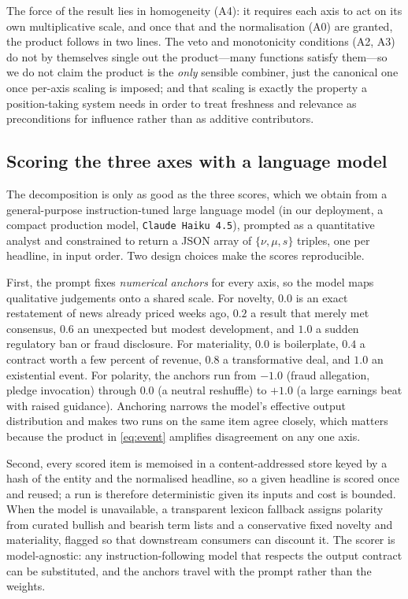 \documentclass{elektr}
\begin{document}
The force of the result lies in homogeneity (A4): it requires each axis to act on its own multiplicative scale, and once that and the normalisation (A0) are granted, the product follows in two lines. The veto and monotonicity conditions (A2, A3) do not by themselves single out the product---many functions satisfy them---so we do not claim the product is the \emph{only} sensible combiner, just the canonical one once per-axis scaling is imposed; and that scaling is exactly the property a position-taking system needs in order to treat freshness and relevance as preconditions for influence rather than as additive contributors.

\subsection{Scoring the three axes with a language model}
\label{sec:scoring}
The decomposition is only as good as the three scores, which we obtain from a general-purpose instruction-tuned large language model (in our deployment, a compact production model, \texttt{Claude Haiku 4.5}), prompted as a quantitative analyst and constrained to return a JSON array of $\{\nu,\mu,s\}$ triples, one per headline, in input order. Two design choices make the scores reproducible.

First, the prompt fixes \emph{numerical anchors} for every axis, so the model maps qualitative judgements onto a shared scale. For novelty, $0.0$ is an exact restatement of news already priced weeks ago, $0.2$ a result that merely met consensus, $0.6$ an unexpected but modest development, and $1.0$ a sudden regulatory ban or fraud disclosure. For materiality, $0.0$ is boilerplate, $0.4$ a contract worth a few percent of revenue, $0.8$ a transformative deal, and $1.0$ an existential event. For polarity, the anchors run from $-1.0$ (fraud allegation, pledge invocation) through $0.0$ (a neutral reshuffle) to $+1.0$ (a large earnings beat with raised guidance). Anchoring narrows the model's effective output distribution and makes two runs on the same item agree closely, which matters because the product in \eqref{eq:event} amplifies disagreement on any one axis.

Second, every scored item is memoised in a content-addressed store keyed by a hash of the entity and the normalised headline, so a given headline is scored once and reused; a run is therefore deterministic given its inputs and cost is bounded. When the model is unavailable, a transparent lexicon fallback assigns polarity from curated bullish and bearish term lists and a conservative fixed novelty and materiality, flagged so that downstream consumers can discount it. The scorer is model-agnostic: any instruction-following model that respects the output contract can be substituted, and the anchors travel with the prompt rather than the weights.
\end{document}
